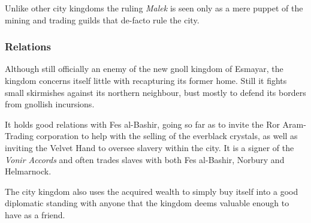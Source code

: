 Unlike other city kingdoms the ruling \emph{Malek} is seen only as a mere
puppet of the mining and trading guilds that de-facto rule the city.

\subsubsection*{Relations}

Although still officially an enemy of the new gnoll kingdom of Esmayar, the
kingdom concerns itself little with recapturing its former home. Still it
fights small skirmishes against its northern neighbour, bust mostly to
defend its borders from gnollish incursions.

It holds good relations with Fes al-Bashir, going so far as to invite the Ror
Aram-Trading corporation to help with the selling of the everblack crystals,
as well as inviting the Velvet Hand to oversee slavery within the city. It is
a signer of the \emph{Vonir Accords} and often trades slaves with both Fes
al-Bashir, Norbury and Helmarnock.

The city kingdom also uses the acquired wealth to simply buy itself into
a good diplomatic standing with anyone that the kingdom deems valuable enough
to have as a friend.

